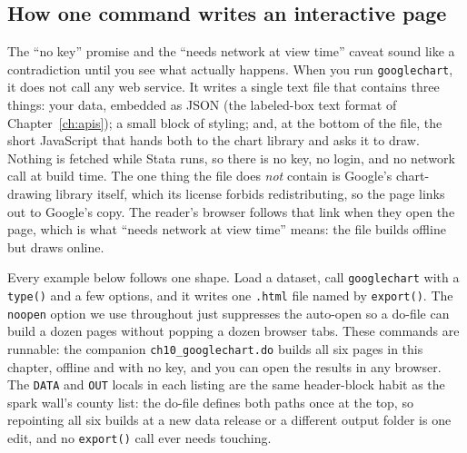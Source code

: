 \subsection{How one command writes an interactive page}\label{sec:gc-how}
The \enquote{no key} promise and the \enquote{needs network at view time} caveat sound like a contradiction until you see what actually happens. When you run \texttt{googlechart}, it does not call any web service. It writes a single text file that contains three things: your data, embedded as JSON (the labeled-box text format of Chapter~\ref{ch:apis}); a small block of styling; and, at the bottom of the file, the short JavaScript that hands both to the chart library and asks it to draw. Nothing is fetched while Stata runs, so there is no key, no login, and no network call at build time. The one thing the file does \emph{not} contain is Google's chart-drawing library itself, which its license forbids redistributing, so the page links out to Google's copy. The reader's browser follows that link when they open the page, which is what \enquote{needs network at view time} means: the file builds offline but draws online.

Every example below follows one shape. Load a dataset, call \texttt{googlechart} with a \texttt{type()} and a few options, and it writes one \texttt{.html} file named by \texttt{export()}. The \texttt{noopen} option we use throughout just suppresses the auto-open so a do-file can build a dozen pages without popping a dozen browser tabs. These commands are runnable: the companion \texttt{ch10\_googlechart.do} builds all six pages in this chapter, offline and with no key, and you can open the results in any browser. The \texttt{DATA} and \texttt{OUT} locals in each listing are the same header-block habit as the spark wall's county list: the do-file defines both paths once at the top, so repointing all six builds at a new data release or a different output folder is one edit, and no \texttt{export()} call ever needs touching.

